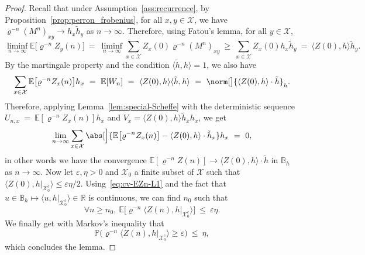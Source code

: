 \begin{refsegment}
\begin{proof}
  Recall that under Assumption~\ref{ass:recurrence}, by Proposition~\ref{prop:perron_frobenius}, for all $x,y\in \mathcal{X}$, we have $\varrho^{-n}(M^n)_{xy} \to h_x\tilde{h}_y$ as $n\to\infty$.
  Therefore, using Fatou's lemma, for all $y\in \mathcal{X}$,
  \[
    \liminf_{n\to\infty} \mathbb{E}\big[\varrho^{-n}Z_y(n)\big]\ =\ \liminf_{n\to\infty} \sum_{x\in \mathcal{X}}Z_x(0)\varrho^{-n}(M^{n})_{xy}\ \geq\ \sum_{x\in \mathcal{X}}Z_x(0)h_x\tilde{h}_y\ =\ \langle Z(0), h\rangle \tilde{h}_y.
  \]
  By the martingale property and the condition $\langle \tilde{h},h\rangle=1$, we also have
  \begin{equation*}
    \sum_{x\in \mathcal{X}} \mathbb{E}\big[\varrho^{-n}Z_x(n)\big]h_x\ =\ \mathbb{E}[W_n]\ =\ \langle Z(0), h\rangle \langle \tilde{h}, h\rangle\ =\ \norm[\big]{\langle Z(0), h\rangle\cdot \tilde{h}}_h.
  \end{equation*}
  Therefore, applying Lemma~\ref{lem:special-Scheffe} with the deterministic sequence $U_{n,x}\ =\ \mathbb{E}[\varrho^{-n}Z_x(n)]h_x$ and $V_x=\langle Z(0),h\rangle  \tilde{h}_xh_x$, we get
  \begin{equation}\label{eq:cv-EZn-L1}  
   \lim_{n\to\infty} \sum_{x\in \mathcal{X}} \abs[\Big]{\mathbb{E}\big[\varrho^{-n}Z_x(n)\big] - \langle Z(0), h\rangle\cdot \tilde{h}_x}h_x\ =\ 0,
  \end{equation}
  in other words we have the convergence $\mathbb{E}[\varrho^{-n}Z(n)]\to \langle Z(0), h\rangle\cdot\tilde{h}$  in $\mathbb{B}_h$ as $n\to\infty$.
  Now let $\varepsilon, \eta >0$ and $\mathcal{X}_0$ a finite subset of $\mathcal{X}$  such that $\langle Z(0), h|_{\mathcal{X}_0^c}\rangle\leq \varepsilon\eta/2$.
  Using~\eqref{eq:cv-EZn-L1} and the fact that $u\in \mathbb{B}_h \mapsto \langle u, h|_{\mathcal{X}_0^c}\rangle\in \mathbb{R}$ is continuous, we can find $n_0$ such that
\begin{equation*}
  \forall n\geq n_0,\ \mathbb{E}\big[\varrho^{-n}\langle Z(n), h|_{\mathcal{X}_0^c}\rangle\big]\ \leq\ \varepsilon\eta. 
\end{equation*}
  We finally get with Markov's inequality that 
  \begin{equation*}
    \mathbb{P}\big(\varrho^{-n}\langle Z(n), h|_{\mathcal{X}_0^c}\rangle\geq \varepsilon\big)\ \leq\ \eta,
  \end{equation*}
  which concludes the lemma.
\end{proof}



\end{refsegment}
